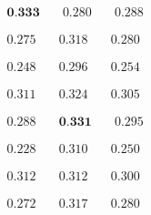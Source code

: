 \newsavebox\embeddiobSF
\begin{lrbox}{\embeddiobSF}
   $\begin{aligned}
     \textbf{0.333} & \quad 0.280 & \quad 0.288
    \end{aligned} $
\end{lrbox}

\newsavebox\embeddiobFoote
\begin{lrbox}{\embeddiobFoote}
   $\begin{aligned}
     0.275 & \quad 0.318 & \quad 0.280
    \end{aligned} $
\end{lrbox}

\newsavebox\embeddiobCNMF
\begin{lrbox}{\embeddiobCNMF}
   $\begin{aligned}
     0.248 & \quad 0.296 & \quad 0.254
    \end{aligned} $
\end{lrbox}

\newsavebox\pcpSF
\begin{lrbox}{\pcpSF}
   $\begin{aligned}
     0.311 & \quad 0.324 & \quad 0.305
    \end{aligned} $
\end{lrbox}

\newsavebox\pcpFoote
\begin{lrbox}{\pcpFoote}
   $\begin{aligned}
     0.288 & \quad \textbf{0.331} & \quad 0.295
    \end{aligned} $
\end{lrbox}

\newsavebox\pcpCNMF
\begin{lrbox}{\pcpCNMF}
   $\begin{aligned}
     0.228 & \quad 0.310 & \quad 0.250
    \end{aligned} $
\end{lrbox}

\newsavebox\tonnetzSF
\begin{lrbox}{\tonnetzSF}
   $\begin{aligned}
     0.312 & \quad 0.312 & \quad 0.300
    \end{aligned} $
\end{lrbox}

\newsavebox\tonnetzFoote
\begin{lrbox}{\tonnetzFoote}
   $\begin{aligned}
     0.272 & \quad 0.317 & \quad 0.280
    \end{aligned} $
\end{lrbox}

